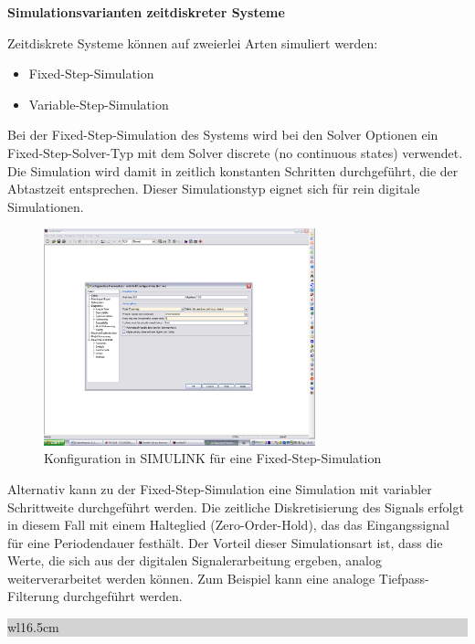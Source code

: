 {\selectfont
\noindent\textbf{Simulationsvarianten zeitdiskreter Systeme}}\smallskip

\noindent Zeitdiskrete Systeme k\"{o}nnen auf zweierlei Arten simuliert werden:

\begin{itemize}
    \item Fixed-Step-Simulation
    \item Variable-Step-Simulation
\end{itemize}

\noindent Bei der Fixed-Step-Simulation des Systems wird bei den Solver Optionen ein Fixed-Step-Solver-Typ mit dem Solver discrete (no continuous states) verwendet. Die Simulation wird damit in zeitlich konstanten Schritten durchgef\"{u}hrt, die der Abtastzeit entsprechen. Dieser Simulationstyp eignet sich f\"{u}r rein digitale Simulationen. 

\begin{figure}[H]
  \centerline{\includegraphics[width=0.7\textwidth]{Kapitel6/Bilder/image18.png}}
  \caption{Konfiguration in SIMULINK für eine Fixed-Step-Simulation}
  \label{fig:DONTHAVE2}
\end{figure}

\noindent Alternativ kann zu der Fixed-Step-Simulation eine Simulation mit variabler Schrittweite durchgef\"{u}hrt werden. Die zeitliche Diskretisierung des Signals erfolgt in diesem Fall mit einem Halteglied (Zero-Order-Hold), das das Eingangssignal f\"{u}r eine Periodendauer festh\"{a}lt. Der Vorteil dieser Simulationsart ist, dass die Werte, die sich aus der digitalen Signalerarbeitung ergeben, analog weiterverarbeitet werden k\"{o}nnen. Zum Beispiel kann eine analoge Tiefpass-Filterung durchgef\"{u}hrt werden. \bigskip

\noindent
\colorbox{lightgray}{%
%
\renewcommand\arraystretch{0.6}%
\begin{tabular}{ wl{16.5cm} }
{\selectfont{Beispiel: Vergleich einer zeitkontinuierlichen und zeitdiskreten Simulation}}
\end{tabular}%
}\medskip

